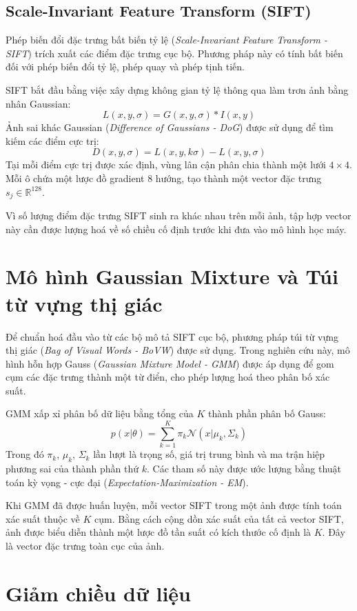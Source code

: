 \subsection{Scale-Invariant Feature Transform (SIFT)}
Phép biến đổi đặc trưng bất biến tỷ lệ (\textit{Scale-Invariant Feature Transform - SIFT}) \cite{Lowe2004SIFT} trích xuất các điểm đặc trưng cục bộ. Phương pháp này có tính bất biến đối với phép biến đổi tỷ lệ, phép quay và phép tịnh tiến.

SIFT bắt đầu bằng việc xây dựng không gian tỷ lệ thông qua làm trơn ảnh bằng nhân Gaussian:
\[
L(x,y,\sigma)=G(x,y,\sigma)*I(x,y)
\]
Ảnh sai khác Gaussian (\textit{Difference of Gaussians - DoG}) được sử dụng để tìm kiếm các điểm cực trị:
\[
D(x,y,\sigma)=L(x,y,k\sigma)-L(x,y,\sigma)
\]
Tại mỗi điểm cực trị được xác định, vùng lân cận phân chia thành một lưới $4\times 4$. Mỗi ô chứa một lược đồ gradient 8 hướng, tạo thành một vector đặc trưng $s_j \in \mathbb{R}^{128}$. 

Vì số lượng điểm đặc trưng SIFT sinh ra khác nhau trên mỗi ảnh, tập hợp vector này cần được lượng hoá về số chiều cố định trước khi đưa vào mô hình học máy.

\section{Mô hình Gaussian Mixture và Túi từ vựng thị giác}
Để chuẩn hoá đầu vào từ các bộ mô tả SIFT cục bộ, phương pháp túi từ vựng thị giác (\textit{Bag of Visual Words - BoVW}) được sử dụng. Trong nghiên cứu này, mô hình hỗn hợp Gauss (\textit{Gaussian Mixture Model - GMM}) được áp dụng để gom cụm các đặc trưng thành một từ điển, cho phép lượng hoá theo phân bố xác suất.

GMM xấp xỉ phân bố dữ liệu bằng tổng của $K$ thành phần phân bố Gauss:
\[
p(x|\theta) = \sum_{k=1}^K \pi_k \mathcal{N}(x|\mu_k, \Sigma_k)
\]
Trong đó $\pi_k$, $\mu_k$, $\Sigma_k$ lần lượt là trọng số, giá trị trung bình và ma trận hiệp phương sai của thành phần thứ $k$. Các tham số này được ước lượng bằng thuật toán kỳ vọng - cực đại (\textit{Expectation-Maximization - EM}). 

Khi GMM đã được huấn luyện, mỗi vector SIFT trong một ảnh được tính toán xác suất thuộc về $K$ cụm. Bằng cách cộng dồn xác suất của tất cả vector SIFT, ảnh được biểu diễn thành một lược đồ tần suất có kích thước cố định là $K$. Đây là vector đặc trưng toàn cục của ảnh.

\section{Giảm chiều dữ liệu}
